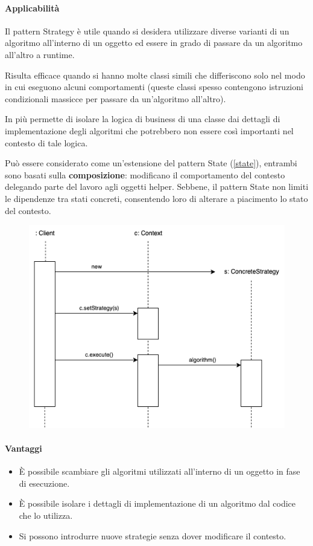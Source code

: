 \paragraph{Applicabilità} Il pattern Strategy è utile quando si desidera utilizzare diverse varianti di un algoritmo all'interno di un oggetto ed essere in grado di passare da un algoritmo all'altro a runtime.

Risulta efficace quando si hanno molte classi simili che differiscono solo nel modo in cui eseguono alcuni comportamenti (queste classi spesso contengono istruzioni condizionali massicce per passare da un'algoritmo all'altro).

In più permette di isolare la logica di business di una classe dai dettagli di implementazione degli algoritmi che potrebbero non essere così importanti nel contesto di tale logica.

Può essere considerato come un'estensione del pattern State (\ref{state}), entrambi sono basati sulla \textbf{composizione}: modificano il comportamento del contesto delegando parte del lavoro agli oggetti helper. Sebbene, il pattern State non limiti le dipendenze tra stati concreti, consentendo loro di alterare a piacimento lo stato del contesto.

\begin{figure}[H]
    \centering
    \includegraphics[width=0.7\linewidth]{assets/pattern/strategy/strategy-sequence.drawio.png}
\end{figure}

\paragraph{Vantaggi}
\begin{itemize}
    \item È possibile scambiare gli algoritmi utilizzati all'interno di un oggetto in fase di esecuzione.
    \item È possibile isolare i dettagli di implementazione di un algoritmo dal codice che lo utilizza.
    \item Si possono introdurre nuove strategie senza dover modificare il contesto.
\end{itemize}

